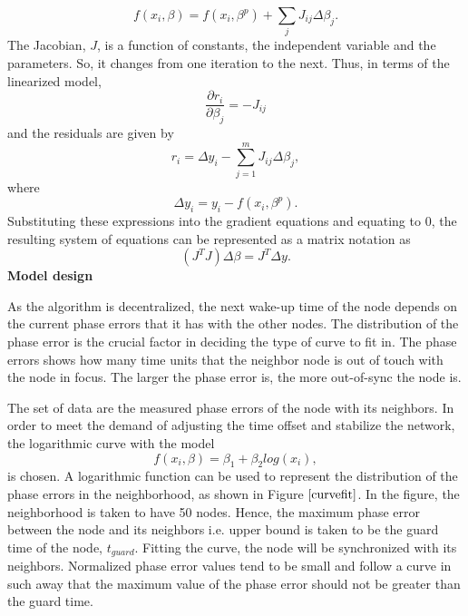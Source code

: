 \documentclass[journal]{IEEEtran}
\begin{document}
\begin{equation}
 f(x_i,\beta) =f(x_i, \beta^p)+\sum_j J_{ij} \Delta\beta_j.
\end{equation}
The Jacobian, $J$, is a function of constants, the independent
variable and the parameters. So, it changes from one iteration to the
next. Thus, in terms of the linearized model,
\begin{equation}
\dfrac{\partial r_i}{\partial \beta_j}=-J_{ij}
\end{equation}
and the residuals are given by
\begin{equation}
    r_i=\Delta y_i- \sum_{j=1}^{m} J_{ij}\Delta\beta_j,
\end{equation}
where
\begin{equation}
 \Delta y_i=y_i- f(x_i, \beta^p).
\end{equation}
Substituting these expressions into the gradient equations and
equating to $0$, the resulting system of equations can be
represented as a matrix notation as
\begin{equation}
    \left(J^TJ\right)\Delta  \beta=J^T\Delta y.
\end{equation}
\textbf{Model design} \par
As the algorithm is decentralized, the next wake-up time of the node depends on
the current phase errors that it has with the other nodes. The distribution of the phase error is the crucial factor in deciding the type of curve to fit in. The phase errors shows how many time units that the neighbor node is out of touch with the node in focus. The larger the phase error is, the more out-of-sync the node is.\par
The set of data are the measured phase errors of the node with its neighbors.
In order to meet the demand of adjusting the time offset and stabilize the network, the logarithmic curve with the model
\begin{equation}
 f(x_i,\beta)= \beta _1 + \beta_2log(x_i),
\end{equation}
is chosen. A logarithmic function can be used to represent the
distribution of the phase errors in the neighborhood, as shown in
Figure $\ref{curvefit}$. In the figure, the neighborhood is taken to
have 50 nodes. Hence, the maximum phase error between the node and
its neighbors i.e. upper bound is taken to be the guard time of the
node, $t_{guard}$. Fitting the curve, the node will be synchronized
with its neighbors. Normalized phase error values tend to be small
and follow a curve in such away that the maximum value of the phase
error should not be greater than the guard time.
\end{document}

